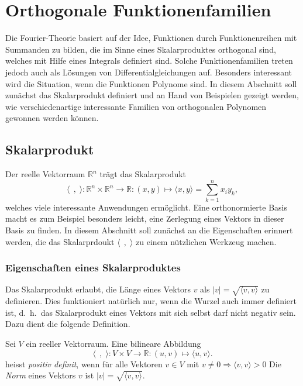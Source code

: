 %
%
%
\section{Orthogonale Funktionenfamilien
\label{buch:orthogonalitaet:section:orthogonale-funktionen}}
Die Fourier-Theorie basiert auf der Idee, Funktionen durch 
Funktionenreihen mit Summanden zu bilden, die im Sinne eines
Skalarproduktes orthogonal sind, welches mit Hilfe eines Integrals
definiert sind.
Solche Funktionenfamilien treten jedoch auch als Lösungen von
Differentialgleichungen auf.
Besonders interessant wird die Situation, wenn die Funktionen 
Polynome sind.
In diesem Abschnitt soll zunächst das Skalarprodukt definiert 
und an Hand von Beispielen gezeigt werden, wie verschiedenartige
interessante Familien von orthogonalen Polynomen gewonnen werden
können.

%
%
\subsection{Skalarprodukt}
Der reelle Vektorraum $\mathbb{R}^n$ trägt das Skalarprodukt
\[
\langle\;\,,\;\rangle
\colon
\mathbb{R}^n \times \mathbb{R}^n \to \mathbb{R}
:
(x,y)\mapsto \langle x, y\rangle = \sum_{k=1}^n x_iy_k,
\]
welches viele interessante Anwendungen ermöglicht.
Eine orthonormierte Basis macht es zum Beispiel besonders leicht,
eine Zerlegung eines Vektors in dieser Basis zu finden.
In diesem Abschnitt soll zunächst an die Eigenschaften erinnert
werden, die das Skalarprdoukt $\langle\;\,,\;\rangle$ zu einem nützlichen 
Werkzeug machen.

%
%
\subsubsection{Eigenschaften eines Skalarproduktes}
Das Skalarprodukt erlaubt, die Länge eines Vektors $v$
als $|v| = \sqrt{\langle v,v\rangle}$ zu definieren.
Dies funktioniert natürlich nur, wenn die Wurzel auch immer
definiert ist, d.~h.~das Skalarprodukt eines Vektors mit sich
selbst darf nicht negativ sein.
Dazu dient die folgende Definition.

\begin{definition}
Sei $V$ ein reeller Vektorraum.
Eine bilineare Abbildung
\[
\langle\;\,,\;\rangle
\colon
V\times V
\to
\mathbb{R}
:
(u,v) \mapsto \langle u,v\rangle.
\]
heisst {\em positiv definit}, wenn für alle Vektoren $v \in V$ mit
%
$v\ne 0 \Rightarrow \langle v,v\rangle > 0$ 
Die {\em Norm} eines Vektors $v$ ist
$|v|=\sqrt{\langle v,v\rangle}$.
%
\end{definition}

